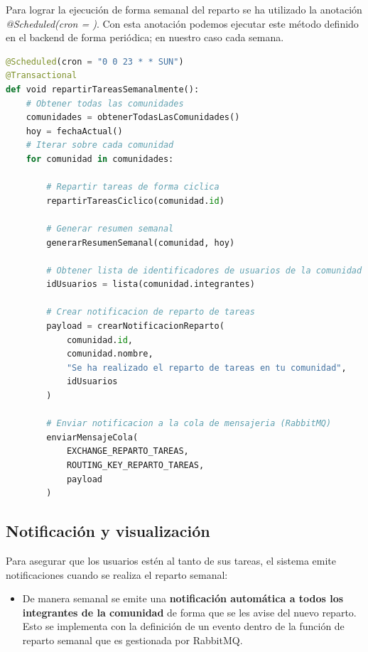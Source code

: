 \vspace{0.25em}
Para lograr la ejecución de forma semanal del reparto se ha utilizado la anotación \textit{@Scheduled(cron = )}. Con esta anotación podemos ejecutar este método definido en el backend de forma periódica; en nuestro caso cada semana.
\begin{lstlisting}[language=Python, caption={Pseudocódigo de la función repartirTareasSemanalmente}]
@Scheduled(cron = "0 0 23 * * SUN")
@Transactional
def void repartirTareasSemanalmente():
    # Obtener todas las comunidades
    comunidades = obtenerTodasLasComunidades()
    hoy = fechaActual()
    # Iterar sobre cada comunidad
    for comunidad in comunidades:
        
        # Repartir tareas de forma ciclica
        repartirTareasCiclico(comunidad.id)
        
        # Generar resumen semanal
        generarResumenSemanal(comunidad, hoy)

        # Obtener lista de identificadores de usuarios de la comunidad
        idUsuarios = lista(comunidad.integrantes)

        # Crear notificacion de reparto de tareas
        payload = crearNotificacionReparto(
            comunidad.id,
            comunidad.nombre,
            "Se ha realizado el reparto de tareas en tu comunidad",
            idUsuarios
        )

        # Enviar notificacion a la cola de mensajeria (RabbitMQ)
        enviarMensajeCola(
            EXCHANGE_REPARTO_TAREAS,
            ROUTING_KEY_REPARTO_TAREAS,
            payload
        )

\end{lstlisting}
\subsection*{Notificación y visualización}

Para asegurar que los usuarios estén al tanto de sus tareas, el sistema emite notificaciones cuando se realiza el reparto semanal:

\begin{itemize}
    \item De manera semanal se emite una \textbf{notificación automática a todos los integrantes de la comunidad} de forma que se les avise del nuevo reparto. Esto se implementa con la definición de un evento dentro de la función de reparto semanal que es gestionada por RabbitMQ. 
\end{itemize}


